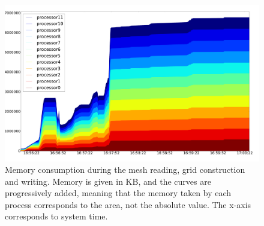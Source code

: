 \begin{figure}
\centering
	 \includegraphics[scale=0.15]{images/realtimelog}
\caption{Memory consumption during the mesh reading, grid construction and writing. Memory is given in KB, and the curves are progressively added, meaning that the memory taken by each process corresponds to the area, not the absolute value. The x-axis corresponds to system time.}
\label{fig:impl:storage:realtimelog}
\end{figure}



% 
% 
